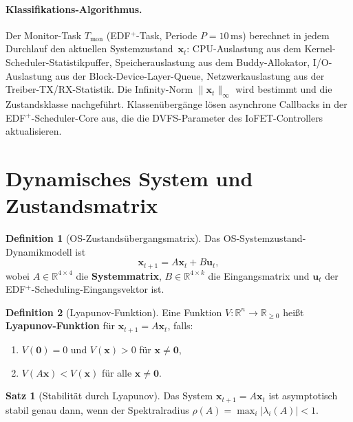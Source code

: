 ﻿\documentclass[a4paper,12pt]{scrreprt}
\theoremstyle{definition}
\newtheorem{definition}{Definition}[chapter]
\newtheorem{satz}{Satz}[chapter]
\begin{document}
	\paragraph{Klassifikations-Algorithmus.}
	Der Monitor-Task $T_{\mathrm{mon}}$ (EDF$^+$-Task, Periode $P = 10\,\text{ms}$)
	berechnet in jedem Durchlauf den aktuellen Systemzustand~$\mathbf{x}_t$:
	CPU-Auslastung aus dem Kernel-Scheduler-Statistikpuffer, Speicherauslastung
	aus dem Buddy-Allokator, I/O-Auslastung aus der Block-Device-Layer-Queue,
	Netzwerkauslastung aus der Treiber-TX/RX-Statistik. Die Infinity-Norm
	$\|\mathbf{x}_t\|_\infty$ wird bestimmt und die Zustandsklasse nachgeführt.
	Klassenübergänge lösen asynchrone Callbacks in der EDF$^+$-Scheduler-Core
	aus, die die DVFS-Parameter des IoFET-Controllers aktualisieren.

	\section{Dynamisches System und Zustandsmatrix}
	
	\begin{definition}[OS-Zustandsübergangsmatrix]
		Das OS-Systemzustand-Dynamikmodell ist
		\[
		\mathbf{x}_{t+1} = A \mathbf{x}_t + B \mathbf{u}_t,
		\]
		wobei $A \in \mathbb{R}^{4 \times 4}$ die \textbf{Systemmatrix},
		$B \in \mathbb{R}^{4 \times k}$ die Eingangsmatrix und
		$\mathbf{u}_t$ der EDF$^+$-Scheduling-Eingangsvektor ist.
	\end{definition}
	
	\begin{definition}[Lyapunov-Funktion]
		Eine Funktion $V: \mathbb{R}^n \to \mathbb{R}_{\geq 0}$ heißt
		\textbf{Lyapunov-Funktion} für $\mathbf{x}_{t+1} = A\mathbf{x}_t$, falls:
		\begin{enumerate}
			\item $V(\mathbf{0}) = 0$ und $V(\mathbf{x}) > 0$ für $\mathbf{x} \neq \mathbf{0}$,
			\item $V(A\mathbf{x}) < V(\mathbf{x})$ für alle $\mathbf{x} \neq \mathbf{0}$.
		\end{enumerate}
	\end{definition}
	
	\begin{satz}[Stabilität durch Lyapunov]\label{satz:lyap_prelim}
		Das System $\mathbf{x}_{t+1} = A\mathbf{x}_t$ ist asymptotisch stabil
		genau dann, wenn der Spektralradius
		$\rho(A) = \max_i |\lambda_i(A)| < 1$.
	\end{satz}
	
\end{document}
